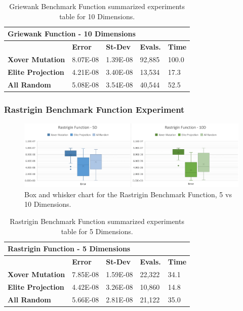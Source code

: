 \documentclass[graybox]{svmult}
\begin{document}
    \begin{table}[]
        \scriptsize
        \centering
        \caption{Griewank Benchmark Function summarized experiments table for 10 Dimensions.}\label{tab.fun_griewank10}
        \begin{tabular}{@{}lllll@{}}
        \toprule
        \multicolumn{5}{l}{\textbf{Griewank Function - 10 Dimensions}} \\ \midrule
        & \textbf{Error} & \textbf{St-Dev} & \textbf{Evals.} & \textbf{Time} \\
        \textbf{Xover Mutation} & 8.07E-08 & 1.39E-08 & 92,885 & 100.0 \\
        \textbf{Elite Projection} & 4.21E-08 & 3.40E-08 & 13,534 & 17.3 \\
        \textbf{All Random} & 5.08E-08 & 3.54E-08 & 40,544 & 52.5 \\ \bottomrule
        \end{tabular}
        \end{table}


\subsubsection{Rastrigin Benchmark Function Experiment}

    \begin{figure}
        \includegraphics[width=\linewidth, frame]{img/fig_fun_rastrigin.pdf}
        \caption{Box and whisker chart for the Rastrigin Benchmark Function, 5 vs 10 Dimensions.} \label{fig.fun_rastrigin}
        \end{figure}

    \begin{table}[]
        \scriptsize
        \centering
        \caption{Rastrigin Benchmark Function summarized experiments table for 5 Dimensions.}\label{tab.fun_rastrigin5}
        \begin{tabular}{@{}lllll@{}}
        \toprule
        \multicolumn{5}{l}{\textbf{Rastrigin Function - 5 Dimensions}} \\ \midrule
        & \textbf{Error} & \textbf{St-Dev} & \textbf{Evals.} & \textbf{Time} \\
        \textbf{Xover Mutation} & 7.85E-08 & 1.59E-08 & 22,322 & 34.1 \\
        \textbf{Elite Projection} & 4.42E-08 & 3.26E-08 & 10,860 & 14.8 \\
        \textbf{All Random} & 5.66E-08 & 2.81E-08 & 21,122 & 35.0 \\ \bottomrule
        \end{tabular}
        \end{table}
\end{document}
